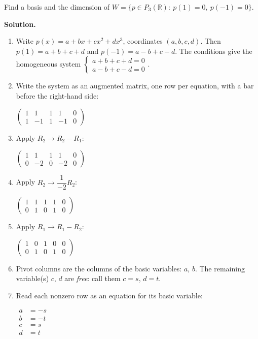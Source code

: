\documentclass[11pt]{article}
\begin{document}
\begin{tcolorbox}[breakable,colback=white,colframe=ink!60,title={\bfseries Example 3 \textperiodcentered\ Basis of a constraint subspace}]Find a basis and the dimension of $W=\{p\in P_3(\mathbb{R}):\ p(1)=0,\ p(-1)=0\}$.
\par\smallskip
\textbf{Solution.} \begin{enumerate}[leftmargin=1.6em,itemsep=1pt,topsep=2pt,label=\arabic*.]\item Write $p(x)=a+bx+cx^{2}+dx^{3}$, coordinates $(a,b,c,d)$. Then $p(1)=a+b+c+d$ and $p(-1)=a-b+c-d$. The conditions give the homogeneous system $\begin{cases}a+b+c+d=0\\ a-b+c-d=0\end{cases}$.
\item Write the system as an augmented matrix, one row per equation, with a bar before the right-hand side:\par\smallskip $\displaystyle \left(\begin{array}{cccc|c}1 & 1 & 1 & 1 & 0 \\ 1 & -1 & 1 & -1 & 0\end{array}\right)$
\item Apply $R_2\to R_2-R_1$:\par\smallskip $\displaystyle \left(\begin{array}{cccc|c}1 & 1 & 1 & 1 & 0 \\ 0 & -2 & 0 & -2 & 0\end{array}\right)$
\item Apply $R_2\to \dfrac{1}{-2} R_2$:\par\smallskip $\displaystyle \left(\begin{array}{cccc|c}1 & 1 & 1 & 1 & 0 \\ 0 & 1 & 0 & 1 & 0\end{array}\right)$
\item Apply $R_1\to R_1-R_2$:\par\smallskip $\displaystyle \left(\begin{array}{cccc|c}1 & 0 & 1 & 0 & 0 \\ 0 & 1 & 0 & 1 & 0\end{array}\right)$
\item Pivot columns are the columns of the basic variables: $a$, $b$. The remaining variable(s) $c$, $d$ are \emph{free}: call them $c=s$, $d=t$.
\item Read each nonzero row as an equation for its basic variable:\par\smallskip $\displaystyle\begin{aligned}a&=-s\\ b&=-t\\ c&=s\\ d&=t\end{aligned}$

\end{enumerate}
\end{tcolorbox}
\end{document}
